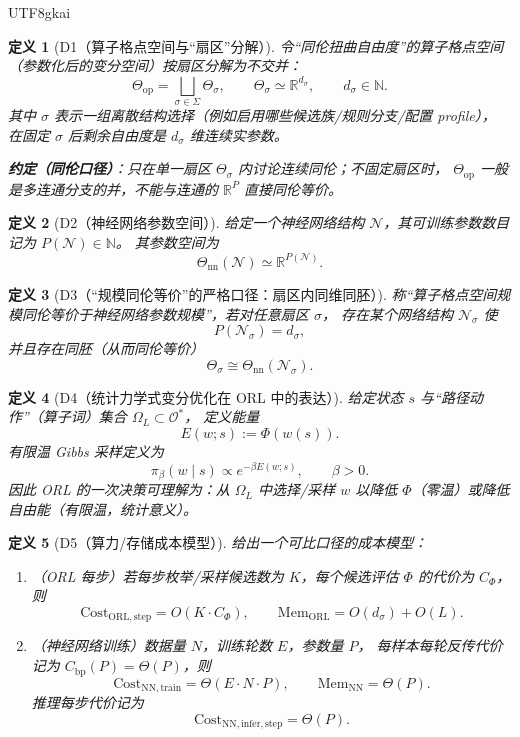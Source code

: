 \documentclass[12pt]{article}
\newtheorem{definition}{定义}[section]
\newcommand{\RR}{\mathbb{R}}
\newcommand{\NN}{\mathbb{N}}
\begin{document}
\begin{CJK*}{UTF8}{gkai}
\begin{definition}[D1（算子格点空间与“扇区”分解）]
\label{def:tex27-ch12-d1}
令“同伦扭曲自由度”的算子格点空间（参数化后的变分空间）按扇区分解为不交并：
\[
  \Theta_{\mathrm{op}}
  =\bigsqcup_{\sigma\in\Sigma}\Theta_\sigma,
  \qquad
  \Theta_\sigma\simeq \RR^{d_\sigma},
  \qquad
  d_\sigma\in\NN.
\]
其中 $\sigma$ 表示一组离散结构选择（例如启用哪些候选族/规则分支/配置 profile），
在固定 $\sigma$ 后剩余自由度是 $d_\sigma$ 维连续实参数。

\textbf{约定（同伦口径）}：只在单一扇区 $\Theta_\sigma$ 内讨论连续同伦；不固定扇区时，
$\Theta_{\mathrm{op}}$ 一般是多连通分支的并，不能与连通的 $\RR^P$ 直接同伦等价。
\end{definition}

\begin{definition}[D2（神经网络参数空间）]
\label{def:tex27-ch12-d2}
给定一个神经网络结构 $\mathcal{N}$，其可训练参数数目记为 $P(\mathcal{N})\in\NN$。
其参数空间为
\[
  \Theta_{\mathrm{nn}}(\mathcal{N}) \simeq \RR^{P(\mathcal{N})}.
\]
\end{definition}

\begin{definition}[D3（“规模同伦等价”的严格口径：扇区内同维同胚）]
\label{def:tex27-ch12-d3}
称“算子格点空间规模同伦等价于神经网络参数规模”，若对任意扇区 $\sigma$，
存在某个网络结构 $\mathcal{N}_\sigma$ 使
\[
  P(\mathcal{N}_\sigma)=d_\sigma,
\]
并且存在同胚（从而同伦等价）
\[
  \Theta_\sigma \cong \Theta_{\mathrm{nn}}(\mathcal{N}_\sigma).
\]
\end{definition}

\begin{definition}[D4（统计力学式变分优化在 ORL 中的表达）]
\label{def:tex27-ch12-d4}
给定状态 $s$ 与“路径动作”（算子词）集合 $\Omega_L\subset\mathcal{O}^*$，
定义能量
\[
  E(w;s):=\Phi(w(s)).
\]
有限温 Gibbs 采样定义为
\[
  \pi_\beta(w\mid s)\propto e^{-\beta E(w;s)},
  \qquad
  \beta>0.
\]
因此 ORL 的一次决策可理解为：从 $\Omega_L$ 中选择/采样 $w$ 以降低 $\Phi$（零温）或降低自由能（有限温，统计意义）。
\end{definition}

\begin{definition}[D5（算力/存储成本模型）]
\label{def:tex27-ch12-d5}
给出一个可比口径的成本模型：
\begin{enumerate}
  \item（ORL 每步）若每步枚举/采样候选数为 $K$，每个候选评估 $\Phi$ 的代价为 $C_\Phi$，则
  \[
    \mathrm{Cost}_{\mathrm{ORL,step}}=O(K\cdot C_\Phi),
    \qquad
    \mathrm{Mem}_{\mathrm{ORL}}=O(d_\sigma)+O(L).
  \]
  \item（神经网络训练）数据量 $N$，训练轮数 $E$，参数量 $P$，
  每样本每轮反传代价记为 $C_{\mathrm{bp}}(P)=\Theta(P)$，则
  \[
    \mathrm{Cost}_{\mathrm{NN,train}}=\Theta(E\cdot N\cdot P),
    \qquad
    \mathrm{Mem}_{\mathrm{NN}}=\Theta(P).
  \]
  推理每步代价记为
  \[
    \mathrm{Cost}_{\mathrm{NN,infer,step}}=\Theta(P).
  \]
\end{enumerate}
\end{definition}


\end{CJK*}
\end{document}

